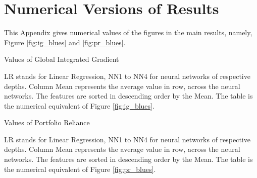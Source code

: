 \chapter{Numerical Versions of Results}
\label{chap:numerical_results} 

This Appendix gives numerical values of the figures in the main results, namely, Figure \ref{fig:ig_blues} and \ref{fig:pr_blues}. 
 

\begin{table}
	\resizebox{\textwidth}{!}{}
	\caption{Values of Global Integrated Gradient}
	\label{tab:ig_blues}
	\medskip
	\small
	LR stands for Linear Regression, NN1 to NN4 for neural networks of respective depths. Column Mean represents the average value in row, across the neural networks. The features are sorted in descending order by the Mean. The table is the numerical equivalent of Figure \ref{fig:ig_blues}. 
\end{table}

 

\begin{table}
		\resizebox{\textwidth}{!}{}
		\caption{Values of Portfolio Reliance}
		\label{tab:pr_blues}
		\medskip
		\small
		LR stands for Linear Regression, NN1 to NN4 for neural networks of respective depths. Column Mean represents the average value in row, across the neural networks. The features are sorted in descending order by the Mean. The table is the numerical equivalent of Figure \ref{fig:pr_blues}. 
\end{table}

 




